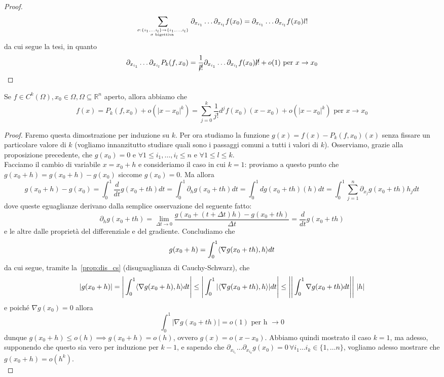 \begin{proof}
$$
\sum_{\sigma: \{i_1, \ldots i_l \} \to \{ i_1, \ldots, i_l \} \atop \sigma \text{ bigettiva }} \partial_{x_{i_1}} \ldots \partial_{x_{i_l}} f(x_0) = \partial_{x_{i_1}} \ldots \partial_{x_{i_l}} f(x_0) l!
$$
da cui segue la tesi, in quanto
$$
\partial_{x_{i_1}} \ldots \partial_{x_{i_l}} P_k(f, x_0) = \frac{1}{\cancel{l!}} \partial_{x_{i_1}} \ldots \partial_{x_{i_l}} f(x_0) \cancel{l!} + o(1) \text{ per } x \to x_0
$$
\end{proof}
\begin{theorem}
Se $f \in C^k ( \Omega ), x_0 \in \Omega, \Omega \subseteq \mathbb{R}^n$ aperto, allora abbiamo che
$$
f(x) = P_k(f, x_0) + o(|x-x_0|^k) = \sum_{j=0}^k \frac{1}{j!} d^j f(x_0)(x-x_0) + o(|x-x_0|^k) \text{ per } x \to x_0
$$
\label{thm:form_taylor}
\end{theorem}
\begin{proof}
Faremo questa dimostrazione per induzione su $k$. Per ora studiamo la funzione $g(x)=f(x)-P_k(f, x_0)(x)$ senza fissare un particolare valore di $k$ (vogliamo innanzitutto studiare quali sono i passaggi comuni a tutti i valori di $k$). Osserviamo, grazie alla proposizione precedente, che $g(x_0) = 0$ e $\forall 1 \leq i_1, \ldots, i_l \leq n$ e $\forall 1 \leq l \leq k$. \\
Facciamo il cambio di variabile $x = x_0 + h$ e consideriamo il caso in cui $k=1$: proviamo a questo punto che $g(x_0+h) = g(x_0 + h) - g(x_0)$ siccome $g(x_0) = 0$. Ma allora
$$
g(x_0 + h) - g(x_0) = \int_0^1 \frac{d}{dt} g(x_0 + th)dt = \int_0^1 \partial_h g(x_0 + th)dt = \int_0^1 dg(x_0 + th)(h)dt = \int_0^1 \sum_{j=1}^n \partial_{x_j} g(x_0 + th) h_j dt
$$
dove queste eguaglianze derivano dalla semplice osservazione del seguente fatto:
$$
\partial_h g(x_0 + th) = \lim_{\Delta t \to 0} \frac{g(x_0 + (t+\Delta t)h) - g(x_0 + th)}{\Delta t} = \frac{d}{dt} g(x_0 + th)
$$
e le altre dalle proprietà del differenziale e del gradiente. Concludiamo che
$$
g(x_0 + h) = \int_{0}^1 \langle \nabla g(x_0 + th), h \rangle dt
$$
da cui segue, tramite la~\ref{prop:dis_cs} (disuguaglianza di Cauchy-Schwarz), che 
$$
|g(x_0 + h)| = \Bigg| \int_{0}^1 \langle \nabla g(x_0 + h), h \rangle dt  \Bigg| \leq \Bigg| \int_{0}^{1} | \langle \nabla g(x_0+th), h \rangle|dt \Bigg| \leq \Bigg| \Bigg| \int_0^1 \nabla g(x_0 + th) dt \Bigg| \Bigg| \, \, | h |
$$
e poiché $\nabla g(x_0) = 0$ allora
$$
\int_0^1 |\nabla g(x_0 + th)| = o(1) \, \, \text{per h } \to 0
$$
dunque $g(x_0 + h) \leq o(h) \implies g(x_0 + h) = o(h)$, ovvero $g(x)=o(x-x_0)$. Abbiamo quindi mostrato il caso $k=1$, ma adesso, supponendo che questo sia vero per induzione per $k-1$, e sapendo che $\partial_{x_{i_1}} \ldots \partial_{x_{i_k}} g(x_0) = 0 \, \forall i_1 \ldots i_k \in \{1, \ldots n \}$, vogliamo adesso mostrare che $g(x_0 + h) = o(h^{k})$. \\

\end{proof}
